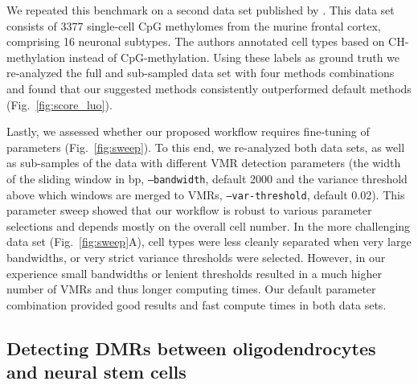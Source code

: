 \documentclass[twocolumn,10pt]{article}
\begin{document}
We repeated this benchmark on a second data set published by \citet{luo2017single}.
This data set consists of 3377 single-cell CpG methylomes from the murine frontal cortex, comprising 16 neuronal subtypes.
The authors annotated cell types based on CH-methylation instead of CpG-methylation.
Using these labels as ground truth we re-analyzed the full and sub-sampled data set with four methods combinations and found that our suggested methods consistently outperformed default methods (Fig.~\ref{fig:score_luo}).

Lastly, we assessed whether our proposed workflow requires fine-tuning of parameters (Fig.~\ref{fig:sweep}).
To this end, we re-analyzed both data sets, as well as sub-samples of the data with different VMR detection parameters (the width of the sliding window in bp, \texttt{--bandwidth}, default 2000 and the variance threshold above which windows are merged to VMRs, \texttt{--var-threshold}, default 0.02).
This parameter sweep showed that our workflow is robust to various parameter selections and depends mostly on the overall cell number.
In the more challenging data set (Fig.~\ref{fig:sweep}A), cell types were less cleanly separated when very large bandwidths, or very strict variance thresholds were selected.
However, in our experience small bandwidths or lenient thresholds resulted in a much higher number of VMRs and thus longer computing times.
Our default parameter combination provided good results and fast compute times in both data sets.


\subsection{Detecting DMRs between oligodendrocytes and neural stem cells}
\end{document}
